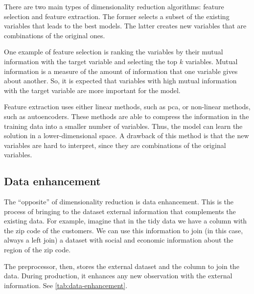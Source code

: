 
There are two main types of dimensionality reduction algorithms: feature selection and
feature extraction.  The former selects a subset of the existing variables that leads
to the best models.  The latter creates new variables that are combinations
of the original ones.


One example of feature selection is ranking the variables by their mutual information with
the target variable and selecting the top $k$ variables.  Mutual information is a measure
of the amount of information that one variable gives about another.  So, it is expected
that variables with high mutual information with the target variable are more important
for the model.

Feature extraction uses either linear methods, such as \gls{pca}, or non-linear methods,
such as autoencoders.  These methods are able to compress the information in the training
data into a smaller number of variables.  Thus, the model can learn the solution in
a lower-dimensional space.  A drawback of this method is that the new variables are
hard to interpret, since they are combinations of the original variables.

\subsection{Data enhancement}

The ``opposite'' of dimensionality reduction is data enhancement.  This is the process of
bringing to the dataset external information that complements the existing data.  For
example, imagine that in the tidy data we have a column with the zip code of the
customers.  We can use this information to join (in this case, always a left join) a
dataset with social and economic information about the region of the zip code.

The preprocessor, then, stores the external dataset and the column to join the data.
During production, it enhances any new observation with the external information.  See
\cref{tab:data-enhancement}.

